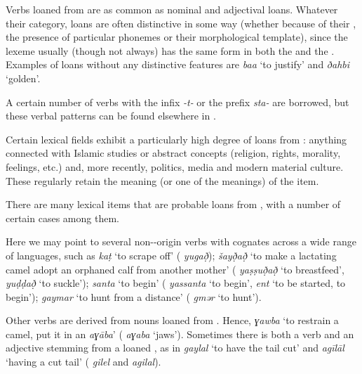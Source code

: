\documentclass[output=paper]{langsci/langscibook}
\begin{document}

Verbs loaned from   are as common as nominal and adjectival loans. Whatever their category, loans are often distinctive in some way (whether because of their , the presence of particular phonemes or their morphological template), since the lexeme usually (though not always) has the same form in both the  and the . Examples of loans without any distinctive features are \textit{ba{\R}{\R}a{\R}} ‘to justify’ and \textit{ðahbi} ‘golden’. 

A certain number of   verbs with the infix \textit{{}-}\textit{t-} or the prefix \textit{sta-} are borrowed, but these verbal patterns can be found elsewhere in . 

Certain lexical fields exhibit a particularly high degree of loans from  : anything connected with Islamic studies or abstract concepts (religion, rights, morality, feelings, etc.) and, more recently, politics, media and modern material culture. These regularly retain the meaning (or one of the meanings) of the  item. 


There are many lexical items that are probable loans from , with a number of certain cases among them. 

Here we may point to several non--origin verbs with cognates across a wide range of  languages, such as \textit{k{\R}aṭ} ‘to scrape off’ ( \textit{yug{\R}að̣}); \textit{šayð̣að̣} ‘to make a lactating camel adopt an orphaned calf from another mother’ ( \textit{yaṣṣuð̣að̣} ‘to breastfeed’, \textit{yuḍḍað̣} ‘to suckle’); \textit{santa} ‘to begin’ ( \textit{yassanta} ‘to begin’,  \textit{ent} ‘to be started, to begin’); \textit{gaymar} ‘to hunt from a distance’ ( \textit{gmər} ‘to hunt'). 

Other verbs are derived from nouns loaned from . Hence, \textit{ɣawba} ‘to restrain a camel, put it in an \textit{aɣāba}’ ( \textit{aɣaba} ‘jaws’). Sometimes there is both a verb and an adjective stemming from a loaned , as in \textit{gaylal} ‘to have the tail cut’ and \textit{agīlāl} ‘having a cut tail’ ( \textit{gilel} and \textit{agilal}). 
\end{document}
